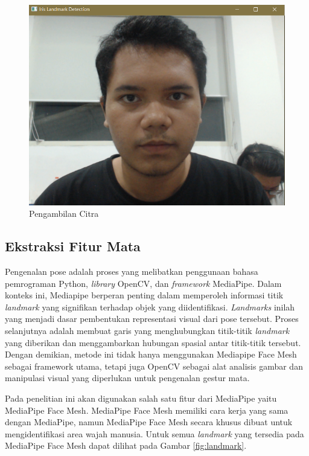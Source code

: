 \begin{figure} [ht] \centering
  \includegraphics[scale=0.35]{gambar/bab3/citra.png}
  \caption{Pengambilan Citra}
  \label{fig:citra}
\end{figure}

\subsection{Ekstraksi Fitur Mata}
Pengenalan pose adalah proses yang melibatkan penggunaan bahasa pemrograman Python, \emph{library} OpenCV, dan \emph{framework} MediaPipe. Dalam konteks ini, Mediapipe berperan penting dalam memperoleh informasi titik \emph{landmark} yang signifikan terhadap objek yang diidentifikasi. \emph{Landmarks} inilah yang menjadi dasar pembentukan representasi visual dari pose tersebut. Proses selanjutnya adalah membuat garis yang menghubungkan titik-titik \emph{landmark} yang diberikan dan menggambarkan hubungan spasial antar titik-titik tersebut. Dengan demikian, metode ini tidak hanya menggunakan Mediapipe Face Mesh sebagai framework utama, tetapi juga  OpenCV sebagai alat analisis gambar dan manipulasi visual yang diperlukan untuk pengenalan gestur mata.

Pada penelitian ini akan digunakan salah satu fitur dari MediaPipe yaitu MediaPipe Face Mesh. MediaPipe Face Mesh memiliki cara kerja yang sama dengan MediaPipe, namun MediaPipe Face Mesh secara khusus dibuat untuk mengidentifikasi area wajah manusia. Untuk semua \textit{landmark} yang tersedia pada MediaPipe Face Mesh dapat dilihat pada Gambar \ref{fig:landmark}.

